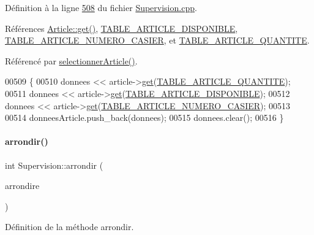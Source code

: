Définition à la ligne \hyperlink{_supervision_8cpp_source_l00508}{508} du fichier \hyperlink{_supervision_8cpp_source}{Supervision.\+cpp}.



Références \hyperlink{_article_8cpp_source_l00266}{Article\+::get()}, \hyperlink{_article_8h_source_l00041}{T\+A\+B\+L\+E\+\_\+\+A\+R\+T\+I\+C\+L\+E\+\_\+\+D\+I\+S\+P\+O\+N\+I\+B\+LE}, \hyperlink{_article_8h_source_l00046}{T\+A\+B\+L\+E\+\_\+\+A\+R\+T\+I\+C\+L\+E\+\_\+\+N\+U\+M\+E\+R\+O\+\_\+\+C\+A\+S\+I\+ER}, et \hyperlink{_article_8h_source_l00040}{T\+A\+B\+L\+E\+\_\+\+A\+R\+T\+I\+C\+L\+E\+\_\+\+Q\+U\+A\+N\+T\+I\+TE}.



Référencé par \hyperlink{_supervision_8cpp_source_l00320}{selectionner\+Article()}.


\begin{DoxyCode}
00509 \{
00510     donnees << article->\hyperlink{class_article_a81e89d4821991a69277f3a0f8e88a001}{get}(\hyperlink{_article_8h_a159354683cfd6e1b578172fbe6490ab6a7273e06be37f8ea80b1c9c16224ebb86}{TABLE\_ARTICLE\_QUANTITE});
00511     donnees << article->\hyperlink{class_article_a81e89d4821991a69277f3a0f8e88a001}{get}(\hyperlink{_article_8h_a159354683cfd6e1b578172fbe6490ab6a105c98cbf3533c6bd74eb706c5d524d6}{TABLE\_ARTICLE\_DISPONIBLE});
00512     donnees << article->\hyperlink{class_article_a81e89d4821991a69277f3a0f8e88a001}{get}(\hyperlink{_article_8h_a159354683cfd6e1b578172fbe6490ab6a43ae9bea39dd3f12e8732bcd2d7c0223}{TABLE\_ARTICLE\_NUMERO\_CASIER});
00513 
00514     donneesArticle.push\_back(donnees);
00515     donnees.clear();
00516 \}
\end{DoxyCode}
\mbox{\label{class_supervision_a16fde33340a8bc8b0936926cd6dc0657}} 
\paragraph{\texorpdfstring{arrondir()}{arrondir()}}
{\footnotesize\ttfamily int Supervision\+::arrondir (\begin{DoxyParamCaption}\item[{Q\+String}]{arrondire }\end{DoxyParamCaption})\hspace{0.3cm}{\ttfamily [private]}}



Définition de la méthode arrondir. 

